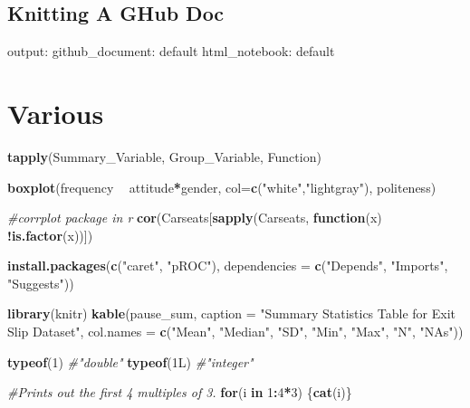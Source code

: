 \documentclass[]{book}
\newenvironment{Shaded}{\begin{snugshade}}{\end{snugshade}}
\newcommand{\KeywordTok}[1]{\textcolor[rgb]{0.13,0.29,0.53}{\textbf{#1}}}
\newcommand{\DataTypeTok}[1]{\textcolor[rgb]{0.13,0.29,0.53}{#1}}
\newcommand{\DecValTok}[1]{\textcolor[rgb]{0.00,0.00,0.81}{#1}}
\newcommand{\StringTok}[1]{\textcolor[rgb]{0.31,0.60,0.02}{#1}}
\newcommand{\CommentTok}[1]{\textcolor[rgb]{0.56,0.35,0.01}{\textit{#1}}}
\newcommand{\ControlFlowTok}[1]{\textcolor[rgb]{0.13,0.29,0.53}{\textbf{#1}}}
\newcommand{\OperatorTok}[1]{\textcolor[rgb]{0.81,0.36,0.00}{\textbf{#1}}}
\newcommand{\NormalTok}[1]{#1}
\theoremstyle{definition}
\theoremstyle{definition}
\theoremstyle{definition}
\theoremstyle{remark}
\begin{document}
\subsection{Knitting A GHub Doc}\label{knitting-a-ghub-doc}

output: github\_document: default html\_notebook: default

\section{Various}\label{various}

\begin{Shaded}
\begin{Highlighting}[]
\KeywordTok{tapply}\NormalTok{(Summary_Variable, Group_Variable, Function)}

\KeywordTok{boxplot}\NormalTok{(frequency }\OperatorTok{~}\StringTok{ }\NormalTok{attitude}\OperatorTok{*}\NormalTok{gender,}
\DataTypeTok{col=}\KeywordTok{c}\NormalTok{(}\StringTok{"white"}\NormalTok{,}\StringTok{"lightgray"}\NormalTok{), politeness)}

\CommentTok{#corrplot package in r}
\KeywordTok{cor}\NormalTok{(Carseats[}\KeywordTok{sapply}\NormalTok{(Carseats, }\ControlFlowTok{function}\NormalTok{(x) }\OperatorTok{!}\KeywordTok{is.factor}\NormalTok{(x))])}

\KeywordTok{install.packages}\NormalTok{(}\KeywordTok{c}\NormalTok{(}\StringTok{"caret"}\NormalTok{, }\StringTok{"pROC"}\NormalTok{), }\DataTypeTok{dependencies =} \KeywordTok{c}\NormalTok{(}\StringTok{"Depends"}\NormalTok{, }\StringTok{"Imports"}\NormalTok{, }\StringTok{"Suggests"}\NormalTok{))}

\KeywordTok{library}\NormalTok{(knitr)}
\KeywordTok{kable}\NormalTok{(pause_sum, }\DataTypeTok{caption =} \StringTok{"Summary Statistics Table for Exit Slip Dataset"}\NormalTok{,}
      \DataTypeTok{col.names =} \KeywordTok{c}\NormalTok{(}\StringTok{"Mean"}\NormalTok{, }\StringTok{"Median"}\NormalTok{, }\StringTok{"SD"}\NormalTok{, }\StringTok{"Min"}\NormalTok{, }\StringTok{"Max"}\NormalTok{, }\StringTok{"N"}\NormalTok{, }\StringTok{"NAs"}\NormalTok{))}

\KeywordTok{typeof}\NormalTok{(}\DecValTok{1}\NormalTok{) }\CommentTok{#"double"}
\KeywordTok{typeof}\NormalTok{(1L) }\CommentTok{#"integer"}

\CommentTok{#Prints out the first 4 multiples of 3.}
\ControlFlowTok{for}\NormalTok{(i }\ControlFlowTok{in} \DecValTok{1}\OperatorTok{:}\DecValTok{4}\OperatorTok{*}\DecValTok{3}\NormalTok{) \{}\KeywordTok{cat}\NormalTok{(i)\}}
\end{Highlighting}
\end{Shaded}
\end{document}
